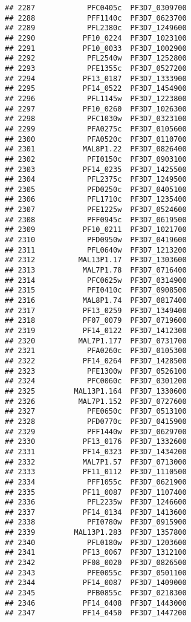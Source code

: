 \documentclass[12pt, a4paper]{article}\usepackage[]{graphicx}\usepackage[]{color}
\makeatletter
\newenvironment{kframe}{%
 \def\at@end@of@kframe{}%
 \ifinner\ifhmode%
  \def\at@end@of@kframe{\end{minipage}}%
  \begin{minipage}{\columnwidth}%
 \fi\fi%
 \def\FrameCommand##1{\hskip\@totalleftmargin \hskip-\fboxsep
 \colorbox{shadecolor}{##1}\hskip-\fboxsep
     \hskip-\linewidth \hskip-\@totalleftmargin \hskip\columnwidth}%
 \MakeFramed {\advance\hsize-\width
   \@totalleftmargin\z@ \linewidth\hsize
   \@setminipage}}%
 {\par\unskip\endMakeFramed%
 \at@end@of@kframe}
\newenvironment{knitrout}{}{} %
\makeatother
\begin{document}
\begin{knitrout}
\begin{kframe}
\begin{verbatim}
## 2287            PFC0405c  PF3D7_0309700
## 2288            PFF1140c  PF3D7_0623700
## 2289            PFL2380c  PF3D7_1249600
## 2290           PF10_0224  PF3D7_1023100
## 2291           PF10_0033  PF3D7_1002900
## 2292            PFL2540w  PF3D7_1252800
## 2293            PFE1355c  PF3D7_0527200
## 2294           PF13_0187  PF3D7_1333900
## 2295           PF14_0522  PF3D7_1454900
## 2296            PFL1145w  PF3D7_1223800
## 2297           PF10_0260  PF3D7_1026300
## 2298            PFC1030w  PF3D7_0323100
## 2299            PFA0275c  PF3D7_0105600
## 2300            PFA0520c  PF3D7_0110700
## 2301           MAL8P1.22  PF3D7_0826400
## 2302            PFI0150c  PF3D7_0903100
## 2303           PF14_0235  PF3D7_1425500
## 2304            PFL2375c  PF3D7_1249500
## 2305            PFD0250c  PF3D7_0405100
## 2306            PFL1710c  PF3D7_1235400
## 2307            PFE1225w  PF3D7_0524600
## 2308            PFF0945c  PF3D7_0619500
## 2309           PF10_0211  PF3D7_1021700
## 2310            PFD0950w  PF3D7_0419600
## 2311            PFL0640w  PF3D7_1213200
## 2312          MAL13P1.17  PF3D7_1303600
## 2313           MAL7P1.78  PF3D7_0716400
## 2314            PFC0625w  PF3D7_0314900
## 2315            PFI0410c  PF3D7_0908500
## 2316           MAL8P1.74  PF3D7_0817400
## 2317           PF13_0259  PF3D7_1349400
## 2318           PF07_0079  PF3D7_0719600
## 2319           PF14_0122  PF3D7_1412300
## 2320          MAL7P1.177  PF3D7_0731700
## 2321            PFA0260c  PF3D7_0105300
## 2322           PF14_0264  PF3D7_1428500
## 2323            PFE1300w  PF3D7_0526100
## 2324            PFC0060c  PF3D7_0301200
## 2325         MAL13P1.164  PF3D7_1330600
## 2326          MAL7P1.152  PF3D7_0727600
## 2327            PFE0650c  PF3D7_0513100
## 2328            PFD0770c  PF3D7_0415900
## 2329            PFF1440w  PF3D7_0629700
## 2330           PF13_0176  PF3D7_1332600
## 2331           PF14_0323  PF3D7_1434200
## 2332           MAL7P1.57  PF3D7_0713000
## 2333           PF11_0112  PF3D7_1110500
## 2334            PFF1055c  PF3D7_0621900
## 2335           PF11_0087  PF3D7_1107400
## 2336            PFL2235w  PF3D7_1246600
## 2337           PF14_0134  PF3D7_1413600
## 2338            PFI0780w  PF3D7_0915900
## 2339         MAL13P1.283  PF3D7_1357800
## 2340            PFL0180w  PF3D7_1203600
## 2341           PF13_0067  PF3D7_1312100
## 2342           PF08_0020  PF3D7_0826500
## 2343            PFE0055c  PF3D7_0501100
## 2344           PF14_0087  PF3D7_1409000
## 2345            PFB0855c  PF3D7_0218300
## 2346           PF14_0408  PF3D7_1443000
## 2347           PF14_0450  PF3D7_1447200

\end{verbatim}
\end{kframe}
\end{knitrout}
\end{document}
